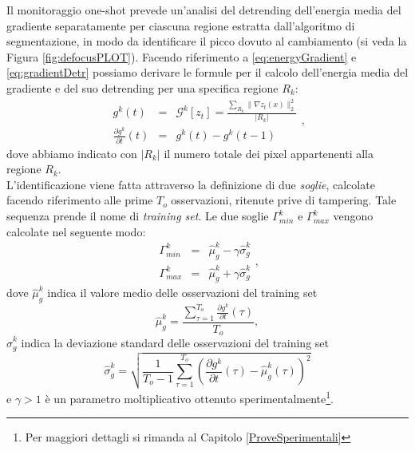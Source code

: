 Il monitoraggio one-shot prevede un'analisi del detrending dell'energia media del gradiente separatamente per ciascuna regione estratta dall'algoritmo di segmentazione, in modo da identificare il picco dovuto al cambiamento (si veda la Figura \ref{fig:defocusPLOT}).
Facendo riferimento a \eqref{eq:energyGradient} e \eqref{eq:gradientDetr} possiamo derivare le formule per il calcolo dell'energia media del gradiente e del suo detrending per una specifica regione $R_k$:
\begin{equation}
\label{eq:gradientRegions}
\begin{array}{ccc}
g^k(t)&  = & \mathcal{G}^k[z_t] = \frac{\sum_{R_k}\| \nabla z_t(x) \| _2^2 }{|{R_k}|}\\
\frac{\partial g^k}{\partial t}(t) & =& g^k(t)-g^k(t-1) 
\end{array},
\end{equation}
dove abbiamo indicato con $|{R_k}|$ il numero totale dei pixel appartenenti alla regione $R_k$.\\
L'identificazione viene fatta attraverso la definizione di due \textit{soglie}, calcolate facendo riferimento alle prime $T_{o}$ osservazioni, ritenute prive di tampering.
Tale sequenza prende il nome di \textit{training set}.
Le due soglie $\Gamma_{min}^k$ e $\Gamma_{max}^k$ vengono calcolate nel seguente modo:
\begin{equation}
\label{eq:soglieGradiente}
\begin{array}{lcl}
\Gamma_{min}^k & = & \hat{\mu}_g^k -\gamma \hat{\sigma}_g^k\\
\Gamma_{max}^k & = & \hat{\mu}_g^k + \gamma \hat{\sigma}_g^k
\end{array},
\end{equation}
dove $\hat{\mu}_g^k$ indica il valore medio delle osservazioni del training set
\begin{equation}
	\hat{\mu}_g^k = \frac{\sum_{\tau = 1}^{T_{o}} \frac{\partial g^k}{\partial t}(\tau)}{T_{o}}, \nonumber
\end{equation}
$\hat{\sigma}_g^k$ indica la deviazione standard delle osservazioni del training set
\begin{equation}
\hat{\sigma}_g^k  = \sqrt{\frac{1}{T_{o}-1}\sum_{\tau=1}^{T_{o}}\left(\frac{\partial g^k}{\partial t}(\tau) - \hat{\mu}_g^k(\tau)\right)^2} \nonumber
\end{equation}
e $\gamma>1$ \`e un parametro moltiplicativo ottenuto sperimentalmente\footnote{Per maggiori dettagli si rimanda al Capitolo \ref{ProveSperimentali}}.\\
